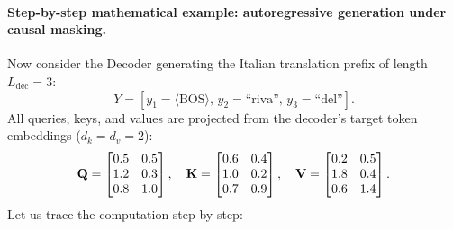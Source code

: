 \documentclass[../../main.tex]{subfiles}
\begin{document}
\paragraph{Step-by-step mathematical example: autoregressive generation under causal masking.}
Now consider the Decoder generating the Italian translation prefix of length $L_{\text{dec}} = 3$:
\begin{equation}
Y = [y_1 = \langle\text{BOS}\rangle,\, y_2 = \text{``riva''},\, y_3 = \text{``del''}].
\end{equation}
All queries, keys, and values are projected from the decoder's target token embeddings ($d_k = d_v = 2$):
\begin{equation}
\label{eq:dec_example_matrices}
\mathbf{Q} = \begin{bmatrix}
0.5 & 0.5 \\
1.2 & 0.3 \\
0.8 & 1.0
\end{bmatrix}, \quad
\mathbf{K} = \begin{bmatrix}
0.6 & 0.4 \\
1.0 & 0.2 \\
0.7 & 0.9
\end{bmatrix}, \quad
\mathbf{V} = \begin{bmatrix}
0.2 & 0.5 \\
1.8 & 0.4 \\
0.6 & 1.4
\end{bmatrix}.
\end{equation}
Let us trace the computation step by step:
\end{document}

